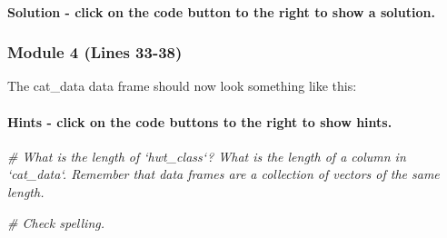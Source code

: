 \documentclass[
]{article}
\newenvironment{Shaded}{\begin{snugshade}}{\end{snugshade}}
\newcommand{\CommentTok}[1]{\textcolor[rgb]{0.56,0.35,0.01}{\textit{#1}}}
\newcommand{\DecValTok}[1]{\textcolor[rgb]{0.00,0.00,0.81}{#1}}
\newcommand{\KeywordTok}[1]{\textcolor[rgb]{0.13,0.29,0.53}{\textbf{#1}}}
\newcommand{\NormalTok}[1]{#1}
\newcommand{\OperatorTok}[1]{\textcolor[rgb]{0.81,0.36,0.00}{\textbf{#1}}}
\newcommand{\StringTok}[1]{\textcolor[rgb]{0.31,0.60,0.02}{#1}}
\begin{document}
\hypertarget{solution---click-on-the-code-button-to-the-right-to-show-a-solution.-1}{%
\paragraph{Solution - click on the code button to the right to show a
solution.}\label{solution---click-on-the-code-button-to-the-right-to-show-a-solution.-1}}

\begin{Shaded}
\end{Shaded}

\hypertarget{module-4-lines-33-38}{%
\subsubsection{Module 4 (Lines 33-38)}\label{module-4-lines-33-38}}

The cat\_data data frame should now look something like this:

\hypertarget{hints---click-on-the-code-buttons-to-the-right-to-show-hints.-2}{%
\paragraph{Hints - click on the code buttons to the right to show
hints.}\label{hints---click-on-the-code-buttons-to-the-right-to-show-hints.-2}}

\begin{Shaded}
\begin{Highlighting}[]
\CommentTok{# What is the length of `hwt_class`? What is the length of a column in `cat_data`. Remember that data frames are a collection of vectors of the same length.}
\end{Highlighting}
\end{Shaded}

\begin{Shaded}
\begin{Highlighting}[]
\CommentTok{# Check spelling.}
\end{Highlighting}
\end{Shaded}
\end{document}

